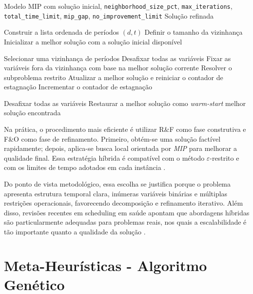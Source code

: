 \begin{algoritmo}
    \caption{Fix-and-Optimize para alocação de médicos}
    \label{alg:fno}
    \begin{algorithmic}[1]
        \Require Modelo MIP com solução inicial, \texttt{neighborhood\_size\_pct}, \texttt{max\_iterations}, \texttt{total\_time\_limit}, \texttt{mip\_gap}, \texttt{no\_improvement\_limit}
        \Ensure Solução refinada

        \State Construir a lista ordenada de períodos $(d,t)$
        \State Definir o tamanho da vizinhança
        \State Inicializar a melhor solução com a solução inicial disponível

        \State Selecionar uma vizinhança de períodos
        \State Desafixar todas as variáveis
        \State Fixar as variáveis fora da vizinhança com base na melhor solução corrente
        \State Resolver o subproblema restrito
        \State Atualizar a melhor solução e reiniciar o contador de estagnação
        \Else
        \State Incrementar o contador de estagnação
        \EndIf
        \EndFor

        \State Desafixar todas as variáveis
        \State Restaurar a melhor solução como \textit{warm-start}
        \State \Return melhor solução encontrada
    \end{algorithmic}
\end{algoritmo}

Na prática, o procedimento mais eficiente é utilizar R\&F como fase construtiva e F\&O como fase de refinamento. Primeiro, obtém-se uma solução factível rapidamente; depois, aplica-se busca local orientada por \textit{MIP} para melhorar a qualidade final. Essa estratégia híbrida é compatível com o método $\varepsilon$-restrito e com os limites de tempo adotados em cada instância \cite{Turhan_Bilgen_2020}.

Do ponto de vista metodológico, essa escolha se justifica porque o problema apresenta estrutura temporal clara, inúmeras variáveis binárias e múltiplas restrições operacionais, favorecendo decomposição e refinamento iterativo. Além disso, revisões recentes em scheduling em saúde apontam que abordagens híbridas são particularmente adequadas para problemas reais, nos quais a escalabilidade é tão importante quanto a qualidade da solução \cite{Vermuyten_Namorado_Rosa_Marques_Belien_Barbosa_Povoa_2018}.

\section{Meta-Heurísticas - Algoritmo Genético}\label{genetico}


